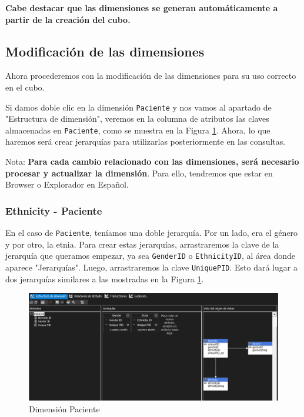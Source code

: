 \documentclass[12pt, a4paper, twoside]{article}
\begin{document}
\textbf{Cabe destacar que las dimensiones se generan automáticamente a partir de la creación del cubo.}

	
\subsection{Modificación de las dimensiones}

Ahora procederemos con la modificación de las dimensiones para su uso correcto en el cubo.

Si damos doble clic en la dimensión \texttt{Paciente} y nos vamos al apartado de "Estructura de dimensión", veremos en la columna de atributos las claves almacenadas en \texttt{Paciente}, como se muestra en la Figura \ref{fig:11}. Ahora, lo que haremos será crear jerarquías para utilizarlas posteriormente en las consultas.

Nota: \textbf{Para cada cambio relacionado con las dimensiones, será necesario procesar y actualizar la dimensión}. Para ello, tendremos que estar en Browser o Explorador en Español.

\subsubsection{Ethnicity - Paciente}

En el caso de \texttt{Paciente}, teníamos una doble jerarquía. Por un lado, era el género y por otro, la etnia. Para crear estas jerarquías, arrastraremos la clave de la jerarquía que queramos empezar, ya sea \texttt{GenderID} o \texttt{EthnicityID}, al área donde aparece "Jerarquías". Luego, arrastraremos la clave \texttt{UniquePID}. Esto dará lugar a dos jerarquías similares a las mostradas en la Figura \ref{fig:11}.

\begin{figure}[H]
	\centering
	\includegraphics[width=1\textwidth]{image/dimPaciente}
	\caption{Dimensión Paciente}
	\label{fig:11}
\end{figure}
\end{document}
